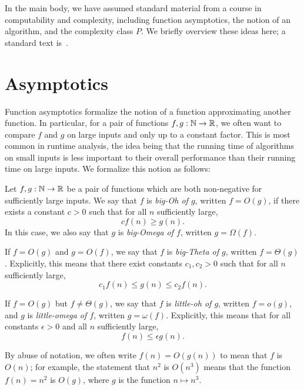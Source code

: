 In the main body, we have assumed standard material from a course in
computability and complexity, including function asymptotics, the notion of an
algorithm, and the complexity class $P$. We briefly overview these ideas here; a
standard text is~\cite{sipser-2013}.

\section{Asymptotics}

Function asymptotics formalize the notion of a function approximating another
function. In particular, for a pair of functions $f,g:\mathbb{N}\to\mathbb{R}$, we often want
to compare $f$ and $g$ on large inputs and only up to a constant factor. This is
most common in runtime analysis, the idea being that the running time of
algorithms on small inputs is less important to their overall performance than
their running time on large inputs. We formalize this notion as follows:

\begin{dfn}
  Let $f,g:\mathbb{N}\to\mathbb{R}$ be a pair of functions which are both non-negative for
  sufficiently large inputs. We say that $f$ is \emph{big-Oh of
  $g$}, written $f=O(g)$, if there exists a constant $c>0$ such that for all $n$
  sufficiently large, \[
    c f(n) \geq g(n).
  \] In this case, we also say that $g$ is \emph{big-Omega of $f$}, written $g =
  \Omega(f)$.

  If $f=O(g)$ and $g=O(f)$, we say that $f$ is \emph{big-Theta of $g$}, written
  $f = \Theta(g)$. Explicitly, this means that there exist constants $c_1,c_2>0$
  such that for all $n$ sufficiently large, \[
    c_1 f(n) \leq g(n) \leq c_2 f(n).
  \]

  If $f=O(g)$ but $f\neq\Theta(g)$, we say that $f$ is \emph{little-oh of $g$},
  written $f=o(g)$, and $g$ is \emph{little-omega of $f$}, written $g =
  \omega(f)$. Explicitly, this means that for all constants $\epsilon>0$ and all
  $n$ sufficiently large, \[
    f(n) \leq \epsilon g(n).
  \]
\end{dfn}

\begin{ntn}
  By abuse of notation, we often write $f(n) = O(g(n))$ to mean that $f$ is
  $O(n)$; for example, the statement that $n^2$ is $O(n^3)$ means that the
  function $f(n) = n^2$ is $O(g)$, where $g$ is the function $n\mapsto n^3$.
\end{ntn}

